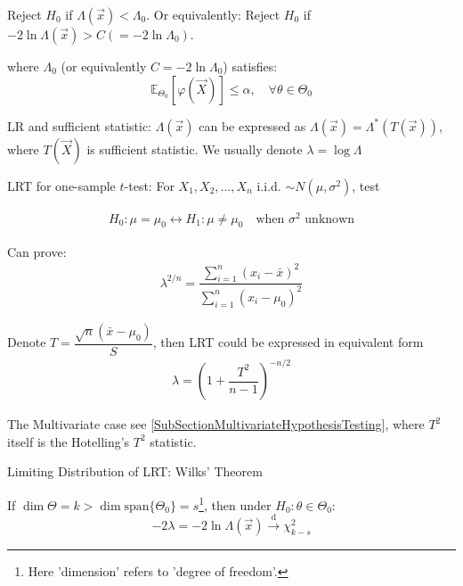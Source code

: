     Reject $H_0$ if $\Lambda(\vec{x})<\Lambda_0$. Or equivalently: Reject $H_0$ if $-2\ln\Lambda(\vec{x})>C(=-2\ln\Lambda_0)$.

    where $\Lambda_0$ (or equivalently $C=-2\ln\Lambda_0$) satisfies:
    \begin{equation}\mathbb{E}_{\Theta_0}[\varphi(\vec{X})]\leq\alpha,\quad\forall\theta\in\Theta_0\end{equation}

    LR and sufficient statistic: $\Lambda(\vec{x})$ can be expressed as $\Lambda(\vec{x})=\Lambda^*(T(\vec{x}))$, where $T(\vec{X})$ is sufficient statistic. We usually denote $ \lambda =\log \Lambda  $


\begin{point}
    LRT for one-sample $ t $-test: For $ X_1,X_2,\ldots,X_n $ i.i.d. $ \sim N(\mu,\sigma ^2) $, test

\begin{align}
    H_0: \mu=\mu_0\longleftrightarrow H_1:\mu\neq\mu_0\quad\text{when }\sigma ^2\text{ unknown}
\end{align}

    Can prove:
    \begin{align}
        \lambda ^{2/n}=\dfrac{\sum\limits_{i=1}^n(x_i-\bar{x})^2}{\sum\limits_{i=1}^n(x_i-\mu_0)^2} 
    \end{align}
    
    Denote $ T=\dfrac{\sqrt{n}(\bar{x}-\mu_0)}{S}$, then LRT could be expressed in equivalent form 
    \begin{align}
        \lambda  = \left( 1+\dfrac{T^2}{n-1} \right)^{-n/2}
    \end{align}
    
    The Multivariate case see {\autoref{SubSectionMultivariateHypothesisTesting}}, where $ T^2 $ itself is the Hotelling's $ T^2 $ statistic.
    
    

\end{point}



\begin{point}
    Limiting Distribution of LRT: Wilks' Theorem
\end{point}

    

    
    If $\dim\Theta=k>\dim\mathrm{span}\{\Theta_0\}=s$\footnote{Here 'dimension' refers to 'degree of freedom'.}, then under $H_0:\theta\in\Theta_0$:
    \begin{equation}
        -2\lambda =-2\ln \Lambda (\vec{x})\xrightarrow[]{\mathrm{d}}\chi_{k-s}^2
    \end{equation}

